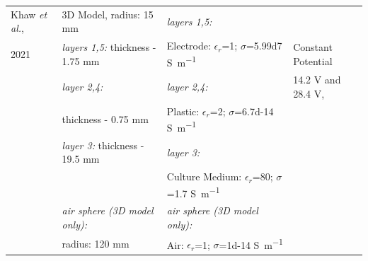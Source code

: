 \begin{table}[p]
\begin{tabularx}{\textwidth}{l l l l}
Khaw \textit{et al.}, & 3D Model, radius: 15 \si{\milli\meter} & \textit{layers 1,5:} & \\
 2021 \cite{Khaw2021-tv} & \textit{layers 1,5:}  thickness - 1.75 \si{\milli\meter} & Electrode: $\epsilon_{r}$=1; $\sigma$=\num{5.99d7} \si{\siemens\per\meter} & Constant Potential \\
& \textit{layer 2,4:} & \textit{layer 2,4:} & 14.2 \si{\volt} and 28.4 \si{\volt},\\
& thickness - 0.75 \si{\milli\meter} & Plastic: $\epsilon_{r}$=2; $\sigma$=\num{6.7d-14} \si{\siemens\per\meter} \cite{Qi2011-se} & \\
& \textit{layer 3:}  thickness - 19.5 \si{\milli\meter} & \textit{layer 3:} & \\
& & Culture Medium: $\epsilon_{r}$=80; $\sigma$=1.7 \si{\siemens\per\meter} & \\
& \textit{air sphere (3D model only):} & \textit{air sphere (3D model only):} & \\
& radius: 120 \si{\milli\meter} & Air: $\epsilon_{r}$=1; $\sigma$=\num{1d-14} \si{\siemens\per\meter} \cite{Seran2017-qg} & \\ \bottomrule[0.15em]
\end{tabularx}
\label{table_prop}
\end{table}



